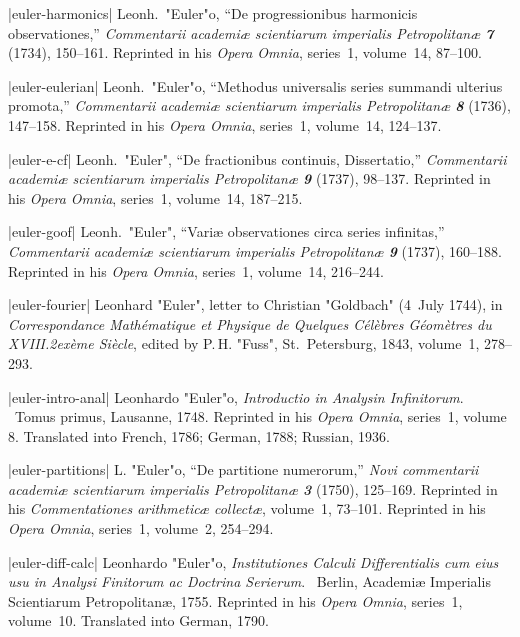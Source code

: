 \bib|euler-harmonics|%
Leonh.~"Euler"o, ``De progressionibus harmonicis observationes,''
{\sl Commentarii academ\-i{\ae} scientiarum imperialis Petropolitan{\ae}
\bf7} (1734), 150--161.
Re\-printed in his {\sl Opera Omnia}, series~1, volume~14, 87--100.

\bib|euler-eulerian|%
Leonh.~"Euler"o, ``Methodus universalis series summandi ulterius promota,''
{\sl Commentarii academ\-i{\ae} scientiarum imperialis Petropolitan{\ae}
\bf8} (1736), 147--158.
Re\-printed in his {\sl Opera Omnia}, series~1, volume~14, 124--137.

\bib|euler-e-cf|%
Leonh.~"Euler", ``De fractionibus continuis, Dissertatio,''
{\sl Commentarii academ\-i{\ae} scientiarum imperialis Petropolitan{\ae}
\bf9} (1737), 98--137.
Reprinted in his {\sl Opera Omnia}, series~1, volume~14, 187--215.

\bib|euler-goof|%
Leonh.~"Euler", ``Vari{\ae} observationes circa series infinitas,''
{\sl Commentarii academ\-i{\ae} scientiarum imperialis Petropolitan{\ae}
\bf9} (1737), 160--188.
Reprinted in his {\sl Opera Omnia}, series~1, volume~14, 216--244.

\bib|euler-fourier|%
Leonhard "Euler", letter to Christian "Goldbach" (4~July 1744), in
{\sl Correspondance Math\'ematique et Physique de Quelques C\'el\`ebres
G\'eom\`etres du XVIII\kern1pt\raise.2ex\hbox{\`eme} Si\`ecle},
 edited by P.\,H. "Fuss", St.~Petersburg, 1843, volume~1, 278--293.

\bib|euler-intro-anal|%
Leonhardo "Euler"o, {\sl Introductio in Analysin Infinitorum}. \
Tomus primus, Lausanne, 1748.
Reprinted in his {\sl Opera Omnia}, series~1, volume 8.
Translated into French, 1786; German, 1788; Russian, 1936.

\bib|euler-partitions|%
L. "Euler"o, ``De partitione numerorum,''
{\sl Novi commentarii academ\-i{\ae} scientiarum imperialis Petropolitan{\ae}
\bf3} (1750), 125--169.
Reprinted in his {\sl Commentationes arithmetic{\ae} collect{\ae}},
volume~1, 73--101.
Reprinted in his {\sl Opera Omnia}, series~1, volume~2, 254--294.

\bib|euler-diff-calc|%
Leonhardo "Euler"o, {\sl Institutiones Calculi Differentialis cum eius usu
in An\-al\-ysi Finitorum ac Doctrina Serierum}. \
Berlin, Academi{\ae} Imperialis Scientiarum Petropolitan\ae, 1755.
Reprinted in his {\sl Opera Omnia}, series~1, volume~10.
Translated into German, 1790.


